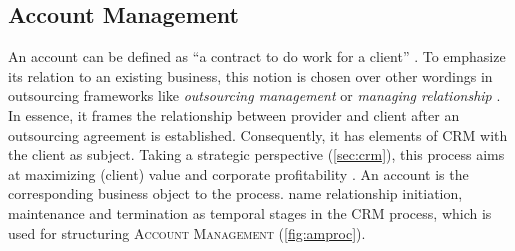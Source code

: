 	
	
	
	
	\subsection{Account Management}
		 \label{pr:acc}
	An account can be defined as \enquote{a contract to do work for a client} \citep{oxfordaccount}. To emphasize its relation to an existing business, this notion is chosen over other wordings in outsourcing frameworks like \textit{outsourcing management} \citep{Franceschini_2003} or \textit{managing relationship} \citep{perunovic2007outsourcing}. In essence, it frames the relationship between provider and client after an outsourcing agreement is established. Consequently, it has elements of \acrshort{CRM} with the client as subject. Taking a strategic perspective (\cf \ref{sec:crm}), this process aims at maximizing (client) value and corporate profitability \citep{payne2004role}. An account is the corresponding business object to the process. \cite{reinartz2004customer} name relationship initiation, maintenance and termination as temporal stages in the \acrshort{CRM} process, which is used for structuring \textsc{Account Management} (\Fig \ref{fig:amproc}).
	

